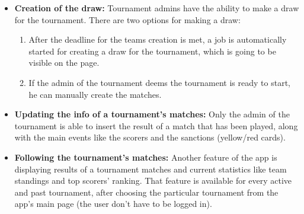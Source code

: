 \begin{itemize}
    \item \textbf{Creation of the draw:}
        Tournament admins have the ability to make a draw for the tournament. There are two options for making a draw: 
        \begin{enumerate}
            \item After the deadline for the teams creation is met, a job is automatically started for creating a draw for the tournament, which is going to be visible on the page.
            \item If the admin of the tournament deems the tournament is ready to start, he can manually create the matches.
        \end{enumerate}
        
    \item \textbf{Updating the info of a tournament's matches:}
        Only the admin of the tournament is able to insert the result of a match that has been played, along with the main events like the scorers and the sanctions (yellow/red cards).
        
    \item \textbf{Following the tournament's matches:}
        Another feature of the app is displaying results of a tournament matches and current statistics like team standings and top scorers' ranking. That feature is available for every active and past tournament, after choosing the particular tournament from the app's main page (the user don't have to be logged in).

\end{itemize}
\newpage
